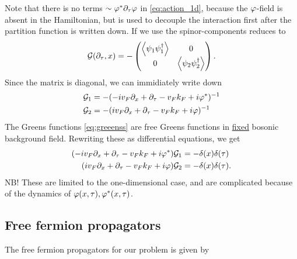 Note that there is no terms $\sim \varphi^*\partial_\tau\varphi$ in \eqref{eq:action_1d}, because the $\varphi$-field is absent in the Hamiltonian, but is used to decouple the interaction first after the partition function is written down. If we use the spinor-components reduces to 
\begin{equation}
\mathcal{G}(\partial_\tau,x) = -\begin{pmatrix}
\ev{\psi_1\psi_1^\dagger} & 0\\
0 & \ev{\psi_2\psi_2^\dagger}
\end{pmatrix}.
\end{equation}
Since the matrix is diagonal, we can immidiately write down 
\begin{align}\label{eq:greeenss}
\begin{split}
\mathcal{G}_1 &= -(-iv_F\partial_x + \partial_\tau - v_Fk_F + i\varphi^*)^{-1} \\
\mathcal{G}_2 &= -(iv_F\partial_x + \partial_\tau - v_Fk_F + i\varphi)^{-1}
\end{split}
\end{align}
The Greens functions \eqref{eq:greeenss} are free Greens functions in \underline{fixed} bosonic background field.
Rewriting these as differential equations, we get
\begin{align}\label{eq:diff_eq_greens}
\begin{split}
(-iv_F\partial_x + \partial_\tau - v_Fk_F + i\varphi^*)\mathcal{G}_1 &= -\delta(x)\delta(\tau) \\
 (iv_F\partial_x + \partial_\tau - v_Fk_F + i\varphi)\mathcal{G}_2 &= -\delta(x)\delta(\tau).
\end{split}
\end{align}
NB! These are limited to the one-dimensional case, and are complicated because of the dynamics of $\varphi(x,\tau), \varphi^*(x, \tau)$.

\subsection[Free propagators]{Free fermion propagators} %

The free fermion propagators for our problem is given by

